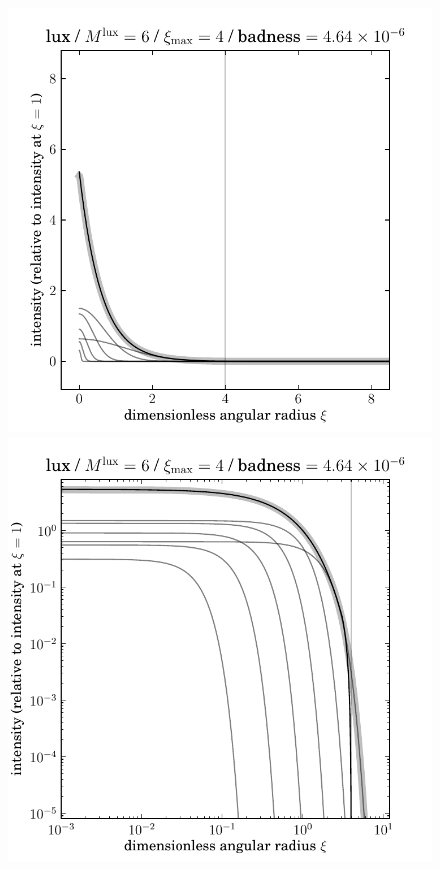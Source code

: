 \documentclass[12pt,pdftex,preprint]{aastex}
\newlength{\figurewidth}
\begin{document}
\clearpage
\begin{figure}
\includegraphics[width=\figurewidth]{lux_K06_MR04_profile.pdf}%
\includegraphics[width=\figurewidth]{lux_K06_MR04_profile_log.pdf}\\

\end{figure}
\end{document}

